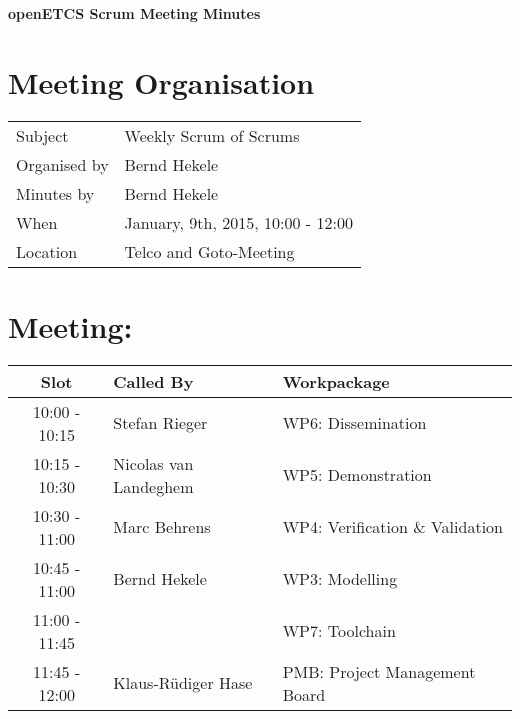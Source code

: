 \documentclass[a4paper, 11pt]{article}
\begin{document}
{\begin{center}\huge\bf openETCS Scrum Meeting Minutes\end{center}}
\section{Meeting Organisation}

\renewcommand{\arraystretch}{1.5}
\begin{supertabular}{m{.2\textwidth}m{.8\textwidth}}
Subject & Weekly Scrum of Scrums\\
Organised by &Bernd Hekele\\
Minutes by & Bernd Hekele\\
When & January, 9th, 2015, 10:00 - 12:00\\
Location & Telco and Goto-Meeting\\
\end{supertabular}

\renewcommand{\arraystretch}{1.0}
\section{Meeting:}

\begin{tabular}{|c|l|l|}
\hline
\textbf{Slot} &  \textbf{Called By} & \textbf{Workpackage} \\
\hline  
10:00 - 10:15 & Stefan Rieger & WP6: Dissemination \\\hline  
10:15 - 10:30 & Nicolas van Landeghem & WP5: Demonstration \\\hline  
10:30 - 11:00 & Marc Behrens & WP4: Verification \& Validation \\\hline  
10:45 - 11:00 & Bernd Hekele & WP3: Modelling \\\hline  
11:00 - 11:45 &  & WP7: Toolchain \\\hline
11:45 - 12:00 & Klaus-R\"udiger Hase & PMB: Project Management Board \\\hline  
\end{tabular}
\end{document}
